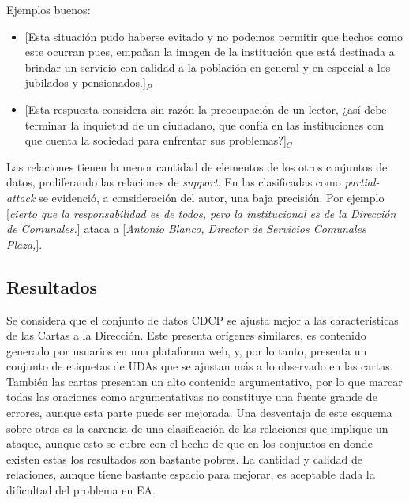 Ejemplos buenos:
\begin{itemize}
	\item \text{} [Esta situación pudo haberse evitado y no podemos permitir que hechos como este ocurran pues, 
	empañan la imagen de la institución que está destinada a brindar un servicio con calidad a la población en 
	general y en especial a los jubilados y pensionados.]$_P$ %
	\item \text{} [Esta respuesta considera sin razón la preocupación de un lector, 
	¿así debe terminar la inquietud de un ciudadano, que confía en las instituciones con que cuenta la 
	sociedad para enfrentar sus problemas?]$_C$ %
\end{itemize}

Las relaciones tienen la menor cantidad de elementos de los otros conjuntos de datos, proliferando
las relaciones de \emph{support}. En las clasificadas como \emph{partial-attack} se evidenció, a 
consideración del autor, una baja precisión. Por ejemplo 
[\emph{cierto que la responsabilidad es de todos, pero la institucional es de la Dirección de Comunales.}]
ataca a [\emph{Antonio Blanco, Director de Servicios Comunales Plaza,}].

\subsection{Resultados}

Se considera que el conjunto de datos CDCP se ajusta mejor a las características de las Cartas 
a la Dirección. Este presenta orígenes similares, es contenido generado por usuarios en una plataforma
web, y, por lo tanto, presenta un conjunto de etiquetas de UDAs que se ajustan más a lo observado 
en las cartas. También las cartas presentan un alto contenido argumentativo, por lo que marcar 
todas las oraciones como argumentativas no constituye una fuente grande de errores, aunque esta 
parte puede ser mejorada. Una desventaja de este esquema sobre otros es la carencia de una 
clasificación de las relaciones que implique un ataque, aunque esto se cubre con el hecho de 
que en los conjuntos en donde existen estas los resultados son bastante pobres. La cantidad 
y calidad de relaciones, aunque tiene bastante espacio para mejorar, es aceptable dada la dificultad 
del problema en EA.

